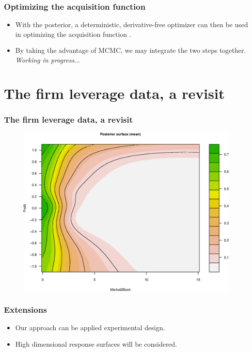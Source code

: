 \documentclass[11pt]{beamer}
\begin{document}
\begin{frame}
  \frametitle{Optimizing the acquisition function}

  \begin{itemize}
  \item With the posterior, a deterministic, derivative-free optimizer
    can then be used in optimizing the acquisition function
    \citep{jones1993lipschitzian, mockus1994application,
      lizotte2008practical}.

  \item By taking the advantage of MCMC, we may integrate the two steps
    together. \emph{Working in progress}...

  \end{itemize}

\end{frame}

\section{The firm leverage data, a revisit}

\begin{frame}
  \frametitle{The firm leverage data, a revisit}

  \begin{figure}
    \centering
    \includegraphics[trim= 0 0 0 0, height=0.85\textheight]{RajanPostMean}
  \end{figure}
\end{frame}


\begin{frame}
  \frametitle{Extensions}
  \begin{itemize}
  \item Our approach can be applied experimental design.
  \item High dimensional response surfaces will be considered.
  \end{itemize}
\end{frame}
\end{document}
